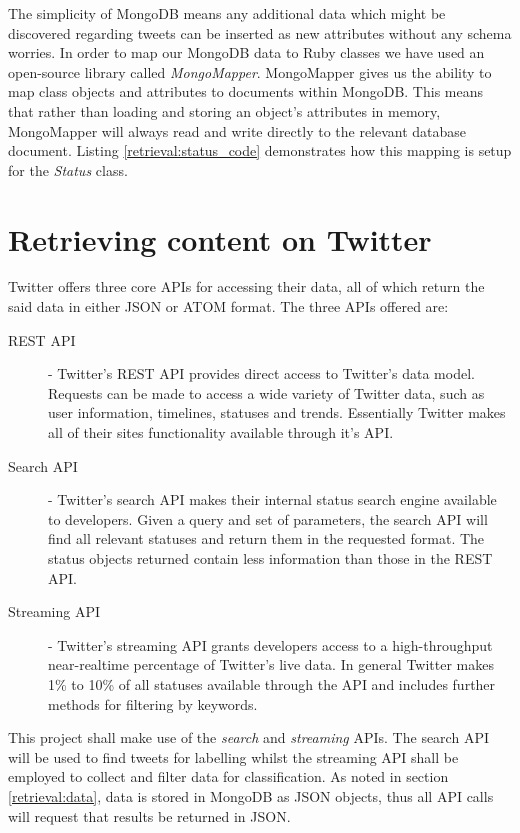 The simplicity of MongoDB means any additional data which might be discovered regarding tweets can be inserted as new attributes without any schema worries. In order to map our MongoDB data to Ruby classes we have used an open-source library called \emph{MongoMapper}. MongoMapper gives us the ability to map class objects and attributes to documents within MongoDB. This means that rather than loading and storing an object's attributes in memory, MongoMapper will always read and write directly to the relevant database document. Listing \ref{retrieval:status_code} demonstrates how this mapping is setup for the \emph{Status} class.

\section{Retrieving content on Twitter}

Twitter offers three core APIs for accessing their data, all of which return the said data in either JSON or ATOM format. The three APIs offered are:

\begin{description}
	\item [REST API] - Twitter's REST API provides direct access to Twitter's data model. Requests can be made to access a wide variety of Twitter data, such as user information, timelines, statuses and trends. Essentially Twitter makes all of their sites functionality available through it's API.
	\item [Search API] - Twitter's search API makes their internal status search engine available to developers. Given a query and set of parameters, the search API will find all relevant statuses and return them in the requested format. The status objects returned contain less information than those in the REST API.
	\item [Streaming API] - Twitter's streaming API grants developers access to a high-throughput near-realtime percentage of Twitter's live data. In general Twitter makes 1\% to 10\% of all statuses available through the API and includes further methods for filtering by keywords.
\end{description}

This project shall make use of the \emph{search} and \emph{streaming} APIs. The search API will be used to find tweets for labelling whilst the streaming API shall be employed to collect and filter data for classification. As noted in section \ref{retrieval:data}, data is stored in MongoDB as JSON objects, thus all API calls will request that results be returned in JSON.

